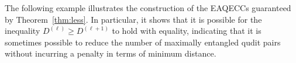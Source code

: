 \documentclass{article}
\DeclareMathOperator{\rank}{rank}
\newtheorem{cor}{Corollary}[section]
\theoremstyle{remark}
\theoremstyle{definition}
\numberwithin{equation}{section}
\begin{document}

The following example illustrates the construction of the EAQECCs guaranteed by Theorem~\ref{thm:less}. In particular, it shows that it is possible for the inequality $D^{(\ell)} \ge D^{(\ell+1)}$ to hold with equality, indicating that it is sometimes possible to reduce the number of maximally entangled qudit pairs without incurring a penalty in terms of minimum distance. 
\end{document}
